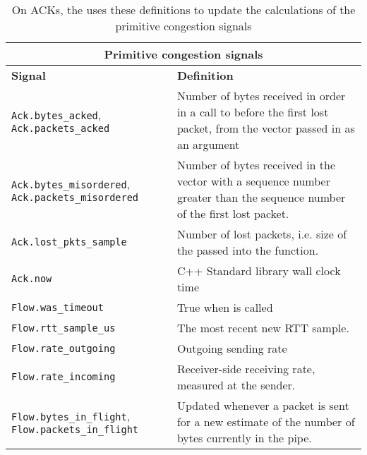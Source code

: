 \begin{table}
    \label{tab:quicsignaldef}
    \centering
    \begin{tabular}{p{}p{}}
        \hline
        \hline
        \multicolumn{2}{c}{Primitive congestion signals} \\
        \hline
        \hline
        \textbf{Signal} & \textbf{Definition} \\
        \texttt{Ack.bytes\_acked}, \texttt{Ack.packets\_acked} & Number of bytes received in order in a call to \ct{OnCongestionEvent} before the first lost packet, from the \ct{AckedPackets} vector passed in as an argument \\
        \texttt{Ack.bytes\_misordered}, \texttt{Ack.packets\_misordered} & Number of bytes received in the \ct{AckedPackets} vector with a sequence number greater than the sequence number of the first lost packet. \\
        \texttt{Ack.lost\_pkts\_sample} & Number of lost packets, i.e. size of the \ct{LostPackets} passed into the \ct{OnCongestionEvent} function. \\
        \texttt{Ack.now} & C++ Standard library wall clock time\\
        \texttt{Flow.was\_timeout} & True when \ct{OnRetransmissionTimeout} is called \\
        \texttt{Flow.rtt\_sample\_us} & The most recent new RTT sample.\\
        \texttt{Flow.rate\_outgoing} & Outgoing sending rate \\
        \texttt{Flow.rate\_incoming} & Receiver-side receiving rate, measured at the sender.  \\
        \texttt{Flow.bytes\_in\_flight}, \texttt{Flow.packets\_in\_flight} & Updated whenever a packet is sent for a new estimate of the number of bytes currently in the pipe. \\
    \end{tabular}
    \caption{On ACKs, the  uses these definitions to update the calculations of the primitive congestion signals}
\end{table}
